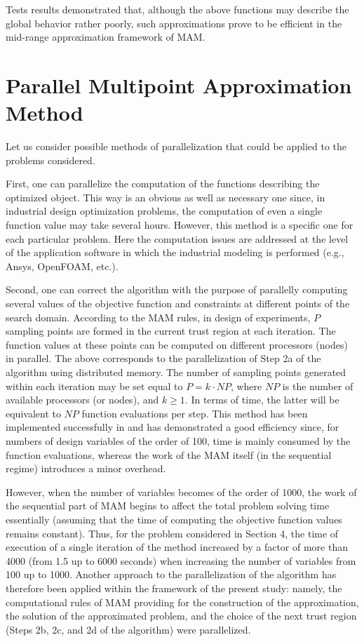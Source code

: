 \documentclass[a4paper]{llncs}
\begin{document}
Tests results demonstrated that, although the above functions may describe the
global behavior rather poorly, such approximations prove to be efficient in the
mid-range approximation framework of MAM.

\section{Parallel Multipoint Approximation Method}\label{sec:par_alg}

Let us consider possible methods of parallelization that could be applied to
the problems considered.

First, one can parallelize the computation of the functions describing the
optimized object. This way is an obvious as well as necessary one since, in
industrial design optimization problems, the computation of even a single
function value may take several hours. However, this method is a specific one
for each particular problem. Here the computation issues are addressed at the
level of the application software in which the industrial modeling is performed
(e.g., Ansys, OpenFOAM, etc.).

Second, one can correct the algorithm with the purpose of parallelly computing
several values of the objective function and constraints at different points of
the search domain. According to the MAM rules, in design of experiments, $P$
sampling points are formed in the current trust region at each iteration. The
function values at these points can be computed on different processors (nodes)
in parallel. The above corresponds to the parallelization of Step 2a of the
algorithm using distributed memory. The number of sampling points generated
within each iteration may be set equal to $P = k\cdot NP$, where $NP$ is the
number of available processors (or nodes), and $k \geq 1$. In terms of time,
the latter will be equivalent to $NP$ function evaluations per step. This
method has been implemented successfully in \cite{PolynkinToropov2008} and has
demonstrated a good efficiency since, for numbers of design variables of the
order of 100, time is mainly consumed by the function evaluations, whereas the
work of the MAM itself (in the sequential regime) introduces a minor overhead.

However, when the number of variables becomes of the order of 1000, the work of
the sequential part of MAM begins to affect the total problem solving time
essentially (assuming that the time of computing the objective function values
remains constant). Thus, for the problem considered in Section 4, the time of
execution of a single iteration of the method increased by a factor of more
than 4000 (from 1.5 up to 6000 seconds) when increasing the number of variables
from 100 up to 1000. Another approach to the parallelization of the algorithm
has therefore been applied within the framework of the present study: namely,
the computational rules of MAM  providing for the construction of the
approximation, the solution of the approximated problem, and the choice of the
next trust region (Steps 2b, 2c, and 2d of the algorithm) were parallelized.
\end{document}
